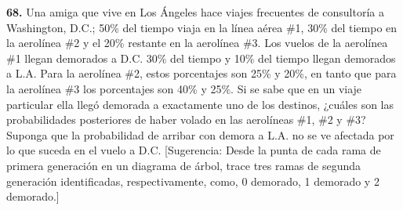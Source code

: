 \documentclass[12pt, letterpaper, spanish]{article}
\begin{document}
\textbf{68.} Una amiga que vive en Los Ángeles hace viajes frecuentes de consultoría a Washington, D.C.; 50\% del tiempo viaja en la línea aérea \#1, 30\% del tiempo en la aerolínea \#2 y el 20\% restante en la aerolínea \#3. Los vuelos de la aerolínea \#1 llegan demorados a D.C. 30\% del tiempo y 10\% del tiempo llegan demorados a L.A. Para la aerolínea \#2, estos porcentajes son 25\% y 20\%, en tanto que para la aerolínea \#3 los porcentajes son 40\% y 25\%. Si se sabe que en un viaje particular ella llegó demorada a exactamente uno de los destinos, ¿cuáles son las probabilidades posteriores de haber volado en las aerolíneas \#1, \#2 y \#3? Suponga que la probabilidad de arribar con demora a L.A. no se ve afectada por lo que suceda en el vuelo a D.C. [Sugerencia: Desde la punta de cada rama de primera generación en un diagrama de árbol, trace tres ramas de segunda generación identificadas, respectivamente, como, 0 demorado, 1 demorado y 2 demorado.]
\end{document}
